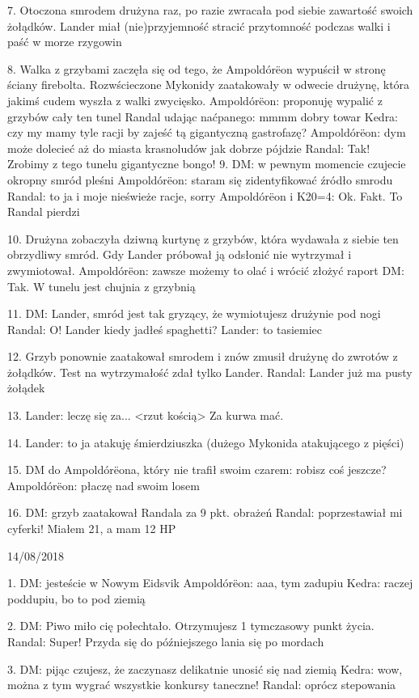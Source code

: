 \documentclass[10pt,twoside,twocolumn]{book}
\begin{document}
7. Otoczona smrodem drużyna raz, po razie zwracała pod siebie zawartość swoich żołądków. Lander miał (nie)przyjemność stracić przytomność podczas walki i paść w morze rzygowin

8. Walka z grzybami zaczęła się od tego, że Ampoldórëon wypuścił w stronę ściany firebolta. Rozwścieczone Mykonidy zaatakowały w odwecie drużynę, która jakimś cudem wyszła z walki zwycięsko.
Ampoldórëon: proponuję wypalić z grzybów cały ten tunel
Randal udając naćpanego: mmmm dobry towar
Kedra: czy my mamy tyle racji by zajeść tą gigantyczną gastrofazę?
Ampoldórëon: dym może dolecieć aż do miasta krasnoludów jak dobrze pójdzie
Randal: Tak! Zrobimy z tego tunelu gigantyczne bongo!
9. DM: w pewnym momencie czujecie okropny smród pleśni
Ampoldórëon: staram się zidentyfikować źródło smrodu
Randal: to ja i moje nieświeże racje, sorry
Ampoldórëon i K20=4: Ok. Fakt. To Randal pierdzi

10. Drużyna zobaczyła dziwną kurtynę z grzybów, która wydawała z siebie ten obrzydliwy smród. Gdy Lander próbował ją odsłonić nie wytrzymał i zwymiotował.
Ampoldórëon: zawsze możemy to olać i wrócić złożyć raport
DM: Tak. W tunelu jest chujnia z grzybnią

11. DM: Lander, smród jest tak gryzący, że wymiotujesz drużynie pod nogi
Randal: O! Lander kiedy jadłeś spaghetti?
Lander: to tasiemiec

12. Grzyb ponownie zaatakował smrodem i znów zmusił drużynę do zwrotów z żołądków. Test na wytrzymałość zdał tylko Lander.
Randal: Lander już ma pusty żołądek

13. Lander: leczę się za... <rzut kością> Za kurwa mać.

14. Lander: to ja atakuję śmierdziuszka (dużego Mykonida atakującego z pięści)

15. DM do Ampoldórëona, który nie trafił swoim czarem: robisz coś jeszcze?
Ampoldórëon: płaczę nad swoim losem

16. DM: grzyb zaatakował Randala za 9 pkt. obrażeń
Randal: poprzestawiał mi cyferki! Miałem 21, a mam 12 HP

14/08/2018

1. DM: jesteście w Nowym Eidsvik
Ampoldórëon: aaa, tym zadupiu
Kedra: raczej poddupiu, bo to pod ziemią

2. DM: Piwo miło cię połechtało. Otrzymujesz 1 tymczasowy punkt życia.
Randal: Super! Przyda się do późniejszego lania się po mordach

3. DM: pijąc czujesz, że zaczynasz delikatnie unosić się nad ziemią
Kedra: wow, można z tym wygrać wszystkie konkursy taneczne!
Randal: oprócz stepowania
\end{document}
